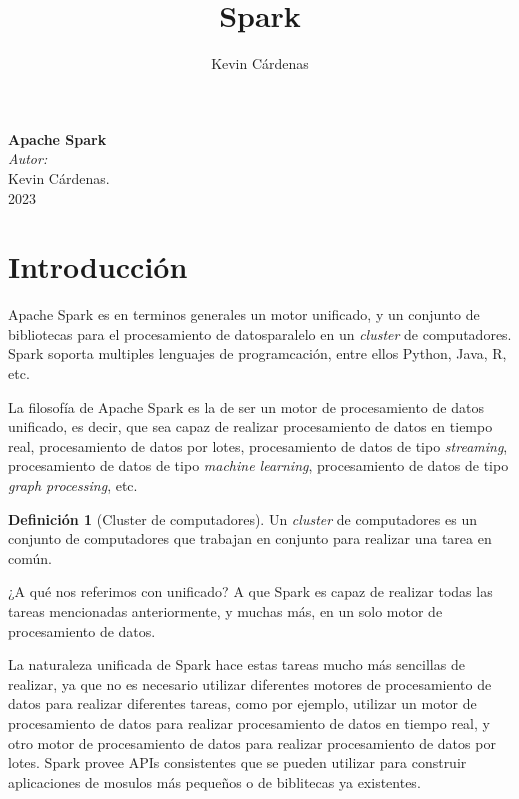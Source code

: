 \documentclass[11pt,oneside]{report}
\title{Spark}
\author{Kevin Cárdenas}
\theoremstyle{plain}
\theoremstyle{definition}
\newtheorem{defi}{Definición}
\begin{document}
\begin{titlepage}
    \begin{center}
        {\Huge \textbf{Apache Spark}}
        \\[16cm]

        \large\emph{Autor:}\\
        Kevin Cárdenas.
        \\
        {\large 2023}
    \end{center}
\end{titlepage}

\newpage
\tableofcontents
\newpage

\section*{Introducción}

Apache Spark es en terminos generales un motor unificado, y un conjunto de bibliotecas para el procesamiento de datosparalelo en un \emph{cluster} de computadores. Spark soporta multiples lenguajes de programcación, entre ellos Python, Java, R, etc.

La filosofía de Apache Spark es la de ser un motor de procesamiento de datos unificado, es decir, que sea capaz de realizar procesamiento de datos en tiempo real, procesamiento de datos por lotes, procesamiento de datos de tipo \emph{streaming}, procesamiento de datos de tipo \emph{machine learning}, procesamiento de datos de tipo \emph{graph processing}, etc.

\begin{defi}[Cluster de computadores]
    Un \emph{cluster} de computadores es un conjunto de computadores que trabajan en conjunto para realizar una tarea en común.
\end{defi}

¿A qué nos referimos con unificado? A que Spark es capaz de realizar todas las tareas mencionadas anteriormente, y muchas más, en un solo motor de procesamiento de datos.

La naturaleza unificada de Spark hace estas tareas mucho más sencillas de realizar, ya que no es necesario utilizar diferentes motores de procesamiento de datos para realizar diferentes tareas, como por ejemplo, utilizar un motor de procesamiento de datos para realizar procesamiento de datos en tiempo real, y otro motor de procesamiento de datos para realizar procesamiento de datos por lotes. Spark provee APIs consistentes que se pueden utilizar para construir aplicaciones de mosulos más pequeños o de biblitecas ya existentes.
\end{document}
